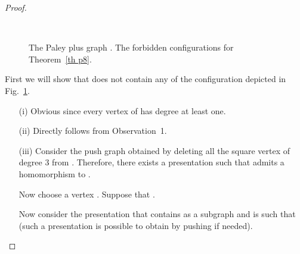 \documentclass[10pt]{article}
\begin{document}
\begin{proof}
\begin{figure}

\caption{ The Paley plus graph .  The forbidden configurations for Theorem~\ref{th p8}.}~\label{figure orientable girth8}

\end{figure}	


First we will show that    does not contain any of the configuration depicted in 
Fig.~\ref{figure orientable girth8}.



\begin{itemize}

\item[(i)] Obvious since every vertex of   has degree at least one.

\item[(ii)] Directly follows from Observation~1.



\item[(iii)] Consider the push graph  obtained by deleting all the square vertex of degree 3 from . Therefore, there exists a presentation 
 such that  admits a homomorphism  to .

Now choose a vertex . 
Suppose that . 

Now consider the presentation  that contains  as a subgraph
and is such that  (such a presentation is possible to obtain by 
pushing  if needed). 


\end{itemize}
\end{proof}
\end{document}
